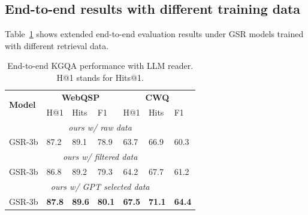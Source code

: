 \documentclass[11pt]{article}
\begin{document}
\subsection{End-to-end results with different training data}
Table~\ref{tab:end_to_end_res_ext} shows extended end-to-end evaluation results under GSR models trained with different retrieval data.
\begin{table}[t]
    \centering
    \small
    \begin{tabular}{l|p{0.5cm}p{0.5cm}p{0.6cm}|p{0.5cm}p{0.5cm}p{0.5cm}}
    \toprule
        \multirow{2}{*}{\bf{Model}} & \multicolumn{3}{c}{\bf{WebQSP}} & \multicolumn{3}{|c}{\bf{CWQ}} \\ 
        & H@1 & Hits & F1 & H@1 & Hits & F1 \\ \midrule
        \multicolumn{7}{c}{\textit{ours w/ raw data}} \\ \midrule
        GSR-3b & 87.2 & 89.1 & 78.9 & 63.7 & 66.9 & 60.3 \\ \midrule
        \multicolumn{7}{c}{\textit{ours w/ filtered data}} \\ \midrule
        GSR-3b & 86.8 & 89.2 & 79.3 & 64.2 & 67.7 & 61.2\\ \midrule
        \multicolumn{7}{c}{\textit{ours w/ GPT selected data}} \\ \midrule
        GSR-3b & \textbf{87.8} & \textbf{89.6} & \textbf{80.1} & \textbf{67.5} & \textbf{71.1} & \textbf{64.4} \\ 
        \bottomrule
    \end{tabular}
\caption{End-to-end KGQA performance with LLM reader. H@1 stands for Hits@1.}
    \label{tab:end_to_end_res_ext}
\end{table}
\end{document}
